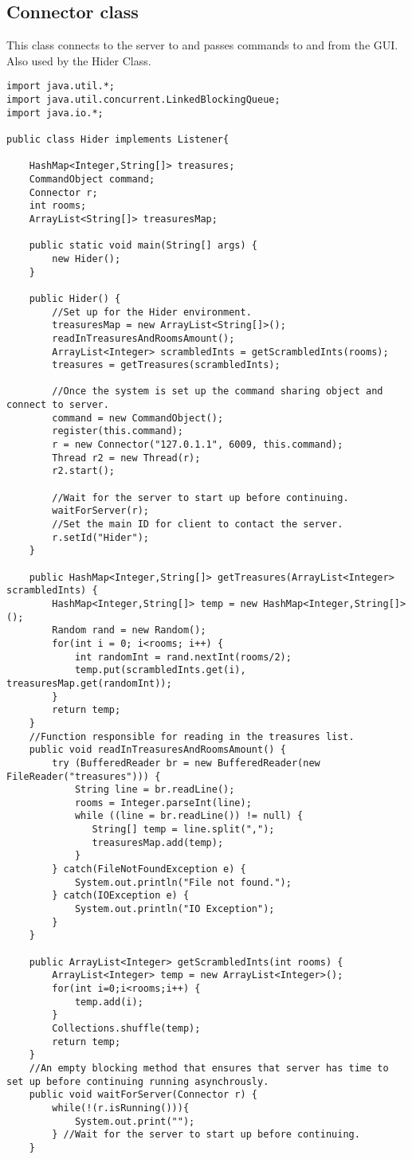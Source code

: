 \subsection{Connector class}
This class connects to the server to and passes commands to and from the GUI. Also used by the Hider Class.
\begin{lstlisting}
import java.util.*;
import java.util.concurrent.LinkedBlockingQueue;
import java.io.*;

public class Hider implements Listener{

	HashMap<Integer,String[]> treasures;
	CommandObject command;
	Connector r;
	int rooms;
	ArrayList<String[]> treasuresMap;

	public static void main(String[] args) {
		new Hider();
	}

	public Hider() {
		//Set up for the Hider environment.
		treasuresMap = new ArrayList<String[]>();
		readInTreasuresAndRoomsAmount();
		ArrayList<Integer> scrambledInts = getScrambledInts(rooms);
		treasures = getTreasures(scrambledInts);
		
		//Once the system is set up the command sharing object and connect to server.
		command = new CommandObject();
		register(this.command);		
		r = new Connector("127.0.1.1", 6009, this.command);
		Thread r2 = new Thread(r);
		r2.start();

		//Wait for the server to start up before continuing.
		waitForServer(r);
		//Set the main ID for client to contact the server.
		r.setId("Hider");
	}

	public HashMap<Integer,String[]> getTreasures(ArrayList<Integer> scrambledInts) {
		HashMap<Integer,String[]> temp = new HashMap<Integer,String[]>();
		Random rand = new Random();
		for(int i = 0; i<rooms; i++) {
			int randomInt = rand.nextInt(rooms/2);
			temp.put(scrambledInts.get(i), treasuresMap.get(randomInt));
		}
		return temp;
	}
	//Function responsible for reading in the treasures list.
	public void readInTreasuresAndRoomsAmount() {
		try (BufferedReader br = new BufferedReader(new FileReader("treasures"))) {
		    String line = br.readLine();
		    rooms = Integer.parseInt(line);
		    while ((line = br.readLine()) != null) {
		       String[] temp = line.split(",");
		       treasuresMap.add(temp);
		    }
		} catch(FileNotFoundException e) {
			System.out.println("File not found.");
		} catch(IOException e) {
			System.out.println("IO Exception");
		}
	}

	public ArrayList<Integer> getScrambledInts(int rooms) {
		ArrayList<Integer> temp = new ArrayList<Integer>();
		for(int i=0;i<rooms;i++) {
			temp.add(i);
		}
		Collections.shuffle(temp);
		return temp;
	}
	//An empty blocking method that ensures that server has time to set up before continuing running asynchrously.
	public void waitForServer(Connector r) {
		while(!(r.isRunning())){
			System.out.print("");
		} //Wait for the server to start up before continuing.
	}



\end{lstlisting}
